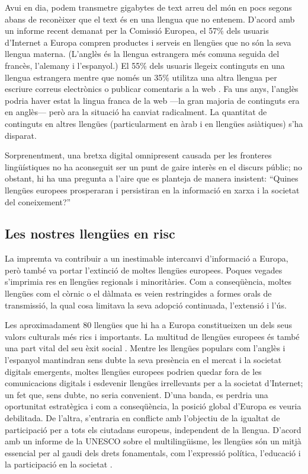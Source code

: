 \begin{multicols}{2}
Avui en dia, podem transmetre gigabytes de text arreu del món en pocs segons abans de reconèixer que el text és en una llengua que no entenem. D’acord amb un informe recent demanat per la Comissió Europea, el 57\% dels usuaris d’Internet a Europa compren productes i serveis en llengües que no són la seva llengua materna. (L’anglès és la llengua estrangera més comuna seguida del francès, l’alemany i l’espanyol.) El 55\% dels usuaris llegeix continguts en una llengua estrangera mentre que només un 35\% utilitza una altra llengua per escriure correus electrònics o publicar comentaris a la web \cite{CAT-Nota1}. Fa uns anys, l’anglès podria haver estat la lingua franca de la web —la gran majoria de continguts era en anglès— però ara la situació ha canviat radicalment. La quantitat de continguts en altres llengües (particularment en àrab i en llengües asiàtiques)  s’ha disparat.

Sorprenentment, una bretxa digital omnipresent causada per les fronteres lingüístiques no ha aconseguit ser un punt de gaire interès en el discurs públic; no obstant, hi ha una pregunta a l’aire que es planteja de manera insistent: “Quines llengües europees prosperaran i persistiran en la informació en xarxa i la societat del coneixement?”

\subsection{Les nostres llengües en risc}

La impremta va contribuir a un inestimable intercanvi d’informació a Europa, però també va portar l’extinció de moltes llengües europees. Poques vegades s’imprimia res en llengües regionals i minoritàries. Com a conseqüència, moltes llengües com el còrnic o el dàlmata es veien restringides a formes orals de transmissió, la qual cosa limitava la seva adopció continuada, l’extensió i l’ús. 


Les aproximadament 80 llengües que hi ha a Europa constitueixen un dels seus valors culturals més rics i importants. La multitud de llengües europees és també una part vital del seu èxit social \cite{CAT-Nota2}. Mentre les llengües populars com l’anglès i l’espanyol mantindran sens dubte la seva presència en el mercat i la societat digitals emergents, moltes llengües europees podrien quedar fora de les comunicacions digitals i esdevenir llengües irrellevants per a la societat d'Internet; un fet que, sens dubte, no seria convenient.  D’una banda, es perdria una oportunitat estratègica i com a conseqüència, la posició global d’Europa es veuria debilitada. De l’altra, s’entraria en conflicte amb l’objectiu de la igualtat de participació per a tots els ciutadans europeus, independent de la llengua. D’acord amb un informe de la UNESCO sobre el multilingüisme, les llengües són un mitjà essencial per al gaudi dels drets fonamentals, com l’expressió política, l’educació i la participació en la societat \cite{CAT-Nota3}.


\end{multicols}
